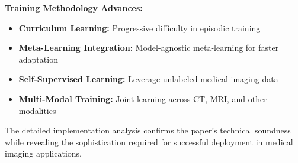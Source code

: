 \textbf{Training Methodology Advances:}
\begin{itemize}
    \item \textbf{Curriculum Learning:} Progressive difficulty in episodic training
    \item \textbf{Meta-Learning Integration:} Model-agnostic meta-learning for faster adaptation
    \item \textbf{Self-Supervised Learning:} Leverage unlabeled medical imaging data
    \item \textbf{Multi-Modal Training:} Joint learning across CT, MRI, and other modalities
\end{itemize}

The detailed implementation analysis confirms the paper's technical soundness while revealing the sophistication required for successful deployment in medical imaging applications.
